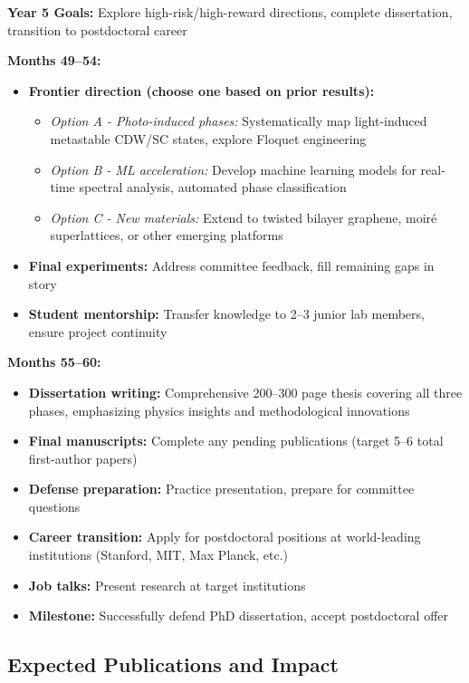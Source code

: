 \documentclass[12pt,a4paper]{article}
\begin{document}
\textbf{Year 5 Goals:} Explore high-risk/high-reward directions, complete dissertation, transition to postdoctoral career

\textbf{Months 49--54:}
\begin{itemize}
    \item \textbf{Frontier direction (choose one based on prior results):}
    \begin{itemize}
        \item \textit{Option A - Photo-induced phases:} Systematically map light-induced metastable CDW/SC states, explore Floquet engineering
        \item \textit{Option B - ML acceleration:} Develop machine learning models for real-time spectral analysis, automated phase classification
        \item \textit{Option C - New materials:} Extend to twisted bilayer graphene, moiré superlattices, or other emerging platforms
    \end{itemize}
    \item \textbf{Final experiments:} Address committee feedback, fill remaining gaps in story
    \item \textbf{Student mentorship:} Transfer knowledge to 2--3 junior lab members, ensure project continuity
\end{itemize}

\textbf{Months 55--60:}
\begin{itemize}
    \item \textbf{Dissertation writing:} Comprehensive 200--300 page thesis covering all three phases, emphasizing physics insights and methodological innovations
    \item \textbf{Final manuscripts:} Complete any pending publications (target 5--6 total first-author papers)
    \item \textbf{Defense preparation:} Practice presentation, prepare for committee questions
    \item \textbf{Career transition:} Apply for postdoctoral positions at world-leading institutions (Stanford, MIT, Max Planck, etc.)
    \item \textbf{Job talks:} Present research at target institutions
    \item \textbf{Milestone:} Successfully defend PhD dissertation, accept postdoctoral offer
\end{itemize}

\subsection{Expected Publications and Impact}
\end{document}
